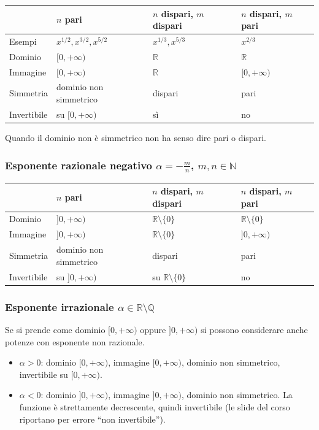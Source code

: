 \documentclass[11pt,a4paper]{article}
\begin{document}
\begin{center}
\renewcommand{\arraystretch}{1.3}
\begin{tabular}{@{}llll@{}}
\toprule
 & $n$ pari & $n$ dispari, $m$ dispari & $n$ dispari, $m$ pari \\
\midrule
Esempi & $x^{1/2}, x^{3/2}, x^{5/2}$ & $x^{1/3}, x^{5/3}$ & $x^{2/3}$ \\
Dominio & $[0,+\infty)$ & $\mathbb{R}$ & $\mathbb{R}$ \\
Immagine & $[0,+\infty)$ & $\mathbb{R}$ & $[0,+\infty)$ \\
Simmetria & dominio non simmetrico & dispari & pari \\
Invertibile & su $[0,+\infty)$ & sì & no \\
\bottomrule
\end{tabular}
\end{center}
Quando il dominio non è simmetrico non ha senso dire pari o dispari.

\subsubsection*{Esponente razionale negativo $\alpha = -\frac{m}{n}$, $m, n \in \mathbb{N}$}

\begin{center}
\renewcommand{\arraystretch}{1.3}
\begin{tabular}{@{}llll@{}}
\toprule
 & $n$ pari & $n$ dispari, $m$ dispari & $n$ dispari, $m$ pari \\
\midrule
Dominio & $]0,+\infty)$ & $\mathbb{R} \setminus \{0\}$ & $\mathbb{R} \setminus \{0\}$ \\
Immagine & $]0,+\infty)$ & $\mathbb{R} \setminus \{0\}$ & $]0,+\infty)$ \\
Simmetria & dominio non simmetrico & dispari & pari \\
Invertibile & su $]0,+\infty)$ & su $\mathbb{R} \setminus \{0\}$ & no \\
\bottomrule
\end{tabular}
\end{center}

\subsubsection*{Esponente irrazionale $\alpha \in \mathbb{R} \setminus \mathbb{Q}$}

Se si prende come dominio $[0,+\infty)$ oppure $]0,+\infty)$ si possono considerare anche potenze con esponente non razionale.
\begin{itemize}
    \item $\alpha > 0$: dominio $[0,+\infty)$, immagine $[0,+\infty)$, dominio non simmetrico, invertibile su $[0,+\infty)$.
    \item $\alpha < 0$: dominio $]0,+\infty)$, immagine $]0,+\infty)$, dominio non simmetrico. La funzione è strettamente decrescente, quindi invertibile (le slide del corso riportano per errore ``non invertibile'').
\end{itemize}
\end{document}
